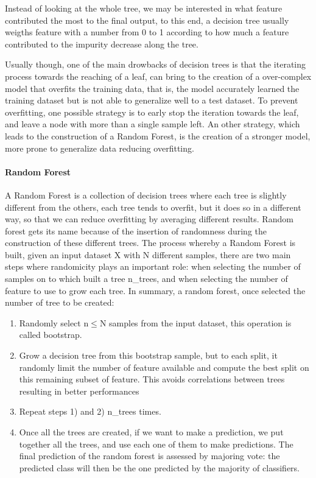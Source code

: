 \documentclass[11pt]{report}
\begin{document}
Instead of looking at the whole tree, we may be interested in what feature contributed the most to the final output, to this end, a decision tree usually weigths feature with a number from 0 to 1 according to how much a feature contributed to the impurity decrease along the tree.
\cite{raschka-2019} \cite{muller-2017}

Usually though, one of the main drowbacks of decision trees is that the iterating process towards the reaching of a leaf, can bring to the creation of a over-complex model that overfits the training data, that is, the model accurately learned the training dataset but is not able to generalize well to a test dataset.
To prevent overfitting, one possible strategy is to early stop the iteration towards the leaf, and leave a node with more than a single sample left.
An other strategy, which leads to the construction of a Random Forest, is the creation of a stronger model, more prone to generalize data reducing overfitting.

\paragraph{Random Forest} \hfill

A Random Forest is a collection of decision trees where each tree is slightly different from the others, each tree tends to overfit, but it does so in a different way, so that we can reduce overfitting by averaging different results.
Random forest gets its name because of the insertion of randomness during the construction of these different trees.
The process whereby a Random Forest is built, given an input dataset X with N different samples, there are two main steps where randomicity plays an important role: when selecting the number of samples on to which built a tree n\_trees, and when selecting the number of feature to use to grow each tree.
In summary, a random forest, once selected the number of tree to be created:
\begin{enumerate}
\item Randomly select n$\leq$N samples from the input dataset, this operation is called bootstrap.
\item Grow a decision tree from this bootstrap sample, but to each split, it randomly limit the number of feature available and compute the best split on this remaining subset of feature. This avoids correlations between trees resulting in better performances
\item Repeat steps 1) and 2) n\_trees times.
\item Once all the trees are created, if we want to make a prediction, we put together all the trees, and use each one of them to make predictions.
The final prediction of the random forest is assessed by majoring vote: the predicted class will then be the one predicted by the majority of classifiers.
\end{enumerate}
\end{document}
